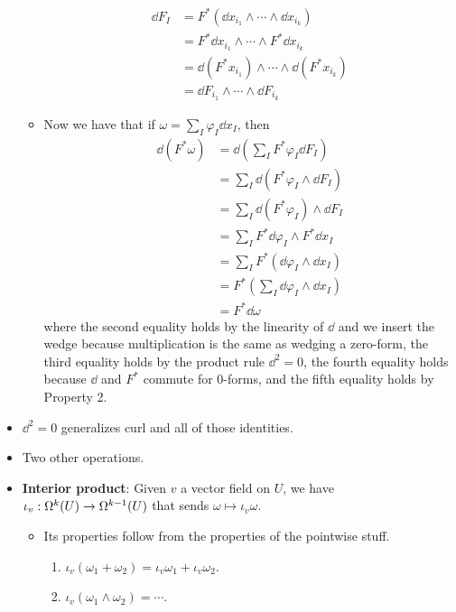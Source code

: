 \documentclass[../notes.tex]{subfiles}
\begin{document}
\begin{itemize}
\begin{itemize}
        \begin{align*}
            \dd{F_I} &= F^*(\dd{x_{i_1}}\wedge\cdots\wedge\dd{x_{i_k}})\\
            &= F^*\dd{x_{i_1}}\wedge\cdots\wedge F^*\dd{x_{i_k}}\tag*{Property 2}\\
            &= \dd(F^*x_{i_1})\wedge\cdots\wedge\dd{(F^*x_{i_k})}\\
            &= \dd{F_{i_1}}\wedge\cdots\wedge\dd{F_{i_k}}
        \end{align*}
        \item Now we have that if $\omega=\sum_I\varphi_I\dd{x_I}$, then
        \begin{align*}
            \dd(F^*\omega) &= \dd(\sum_IF^*\varphi_I\dd{F_I})\\
            &= \sum_I\dd(F^*\varphi_I\wedge\dd{F_I})\\
            &= \sum_I\dd(F^*\varphi_I)\wedge\dd{F_I}\\
            &= \sum_IF^*\dd{\varphi_I}\wedge F^*\dd{x_I}\\
            &= \sum_IF^*(\dd{\varphi_I}\wedge\dd{x_I})\\
            &= F^*\left( \sum_I\dd{\varphi_I}\wedge\dd{x_I} \right)\\
            &= F^*\dd{\omega}
        \end{align*}
        where the second equality holds by the linearity of $\dd$ and we insert the wedge because multiplication is the same as wedging a zero-form, the third equality holds by the product rule $\dd^2=0$, the fourth equality holds because $\dd$ and $F^*$ commute for 0-forms, and the fifth equality holds by Property 2.
    \end{itemize}
    \item $\dd^2=0$ generalizes curl and all of those identities.
    \item Two other operations.
    \item \textbf{Interior product}: Given $v$ a vector field on $U$, we have $\iota_v:\ome[k]{U}\to\ome[k-1]{U}$ that sends $\omega\mapsto\iota_v\omega$.
    \begin{itemize}
        \item Its properties follow from the properties of the pointwise stuff.
        \begin{enumerate}
            \item $\iota_v(\omega_1+\omega_2)=\iota_v\omega_1+\iota_v\omega_2$.
            \item $\iota_v(\omega_1\wedge\omega_2)=\cdots$.

\end{enumerate}
\end{itemize}
\end{itemize}
\end{document}
